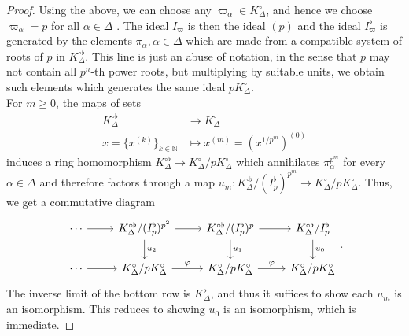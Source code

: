\documentclass[12pts,a4paper]{amsart}
\begin{document}
\begin{proof}
	Using the above, we can choose any $\varpi_\alpha\in K^\circ_\Delta$, and hence we choose $\varpi_\alpha=p$ for all $\alpha\in\Delta$ . The ideal $I_\varpi$ is then the ideal $(p)$ and the ideal $I^\flat_\varpi$ is generated by the elements $\pi_\alpha,\alpha\in\Delta$ which are made from a compatible system of roots of $p$ in $K^{\circ\flat}_\Delta$. This line is just an abuse of notation, in the sense that $p$ may not contain all $p^n$-th power roots, but multiplying by suitable units, we obtain such elements which generates the same ideal $pK^\circ_\Delta$. \\
	
	For $m\geq 0$, the maps of sets 
	\begin{align*}
		K^{\circ\flat}_\Delta&\to K^\circ_\Delta\\
		x=\{x^{(k)}\}_{k\in\mathbb{N}}&\mapsto x^{(m)}=(x^{1/p^m})^{(0)}
	\end{align*}
	induces a ring homomorphism $K^{\circ\flat}_\Delta\to K^\circ_\Delta/pK^\circ_\Delta$ which annihilates $\pi^{p^m}_\alpha$ for every $\alpha\in\Delta$ and therefore factors through a map $u_m:K^{\circ\flat}_\Delta/(I^\flat_p)^{p^m}\to K^\circ_\Delta/pK^\circ_\Delta$. Thus, we get a commutative diagram 
	\[
	\begin{tikzcd}
		\cdots \arrow[r]& K^{\circ\flat}_\Delta/(I^\flat_p)^{p^2}\arrow[r]\arrow[d,"u_2"] & K^{\circ\flat}_\Delta/(I^\flat_p)^p\arrow[r]\arrow[d,"u_1"] & K^{\circ\flat}_\Delta/I^\flat_p\arrow[d,"u_0"]\\
		\cdots\arrow[r]& K^\circ_\Delta/pK^\circ_\Delta\arrow[r,"\varphi"] & K^\circ_\Delta/pK^\circ_\Delta\arrow[r,"\varphi"] & K^\circ_\Delta/pK^\circ_\Delta
	\end{tikzcd}.
	\]
	The inverse limit of the bottom row is $K^\flat_\Delta$, and thus it suffices to show each $u_m$ is an isomorphism. This reduces to showing $u_0$ is an isomorphism, which is immediate.
\end{proof}
\end{document}
